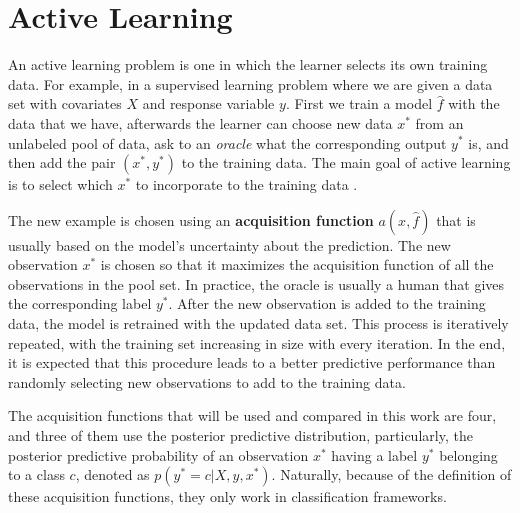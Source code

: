 
\chapter{Active Learning}
\label{ch:active_learning}



An active learning problem is one in which the learner selects its own training data. For example, in a supervised learning problem where we are given a data set with covariates $X$ and response variable $y$. First we train a model $\hat{f}$ with the data that we have, afterwards the learner can choose new data $x^*$ from an unlabeled pool of data, ask to an \textit{oracle} what the corresponding output $y^*$ is, and then add the pair $(x^*, y^*)$ to the training data. The main goal of active learning is to select which $x^*$ to incorporate to the training data \cite{cohn1996active}.

The new example is chosen using an \textbf{acquisition function} $a(x, \hat{f})$ that is usually based on the model's uncertainty about the prediction. The new observation $x^*$ is chosen so that it maximizes the acquisition function of all the observations in the pool set. In practice, the oracle is usually a human that gives the corresponding label $y^*$. After the new observation is added to the training data, the model is retrained with the updated data set. This process is iteratively repeated, with the training set increasing in size with every iteration. In the end, it is expected that this procedure leads to a better predictive performance than randomly selecting new observations to add to the training data.

The acquisition functions that will be used and compared in this work are four, and three of them use the posterior predictive distribution, particularly, the posterior predictive probability of an observation $x^*$ having a label $y^*$ belonging to a class $c$, denoted as  $p(y^* = c | X, y, x^*)$. Naturally, because of the definition of these acquisition functions, they only work in classification frameworks.

